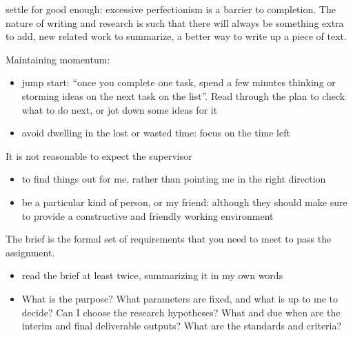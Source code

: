 \documentclass[10pt,a4paper,twocolumn]{article}
\begin{document}
settle for good enough: excessive perfectionism is a barrier to completion. The nature
of writing and research is such that there will always be something extra to add, new
related work to summarize, a better way to write up a piece of text.

Maintaining momentum: 
\begin{itemize}
  \item jump start: ``once you complete one task, spend a few minutes thinking or storming
  ideas on the next task on the list''. Read through the plan to check what to do next,
  or jot down some ideas for it
  \item avoid dwelling in the lost or wasted time: focus on the time left
\end{itemize}

It is not reasonable to expect the supervisor
\begin{itemize}
  \item to find things out for me, rather than pointing me in the right direction
  \item be a particular kind of person, or my friend: although they should make
  sure to provide a constructive and friendly working environment
\end{itemize}


The brief is the formal set of requirements that you need to meet to pass the assignment.
\begin{itemize}
  \item read the brief at least twice, summarizing it in my own words
  \item What is the purpose? What parameters are fixed, and what is up to me to decide? Can
  I choose the research hypotheses? What and due when are the interim and final deliverable
  outputs? What are the standards and criteria?
\end{itemize}
\end{document}
